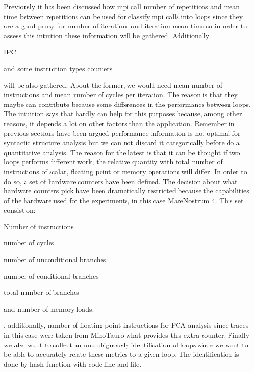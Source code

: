 Previously it has been discussed how mpi call number of repetitions and mean time
between repetitions can be used for classify mpi calls into loops since they are 
a good proxy for number of iterations and iteration mean time so in order to
assess this intuition these information will be gathered. 
Additionally
\begin{enumerate*}[label=\roman*)]
    \item IPC 
    \item and some instruction types counters 
\end{enumerate*}
will be also gathered.
About the former, we would need mean number of instructions and mean number of 
cycles per iteration. The reason is that they maybe can contribute because some 
differences in the performance between loops. The intuition says that
hardly can help for this purposes because, among other reasons, it depends a lot
on other factors than the application. Remember in previous sections have been argued
performance information is not optimal for syntactic structure analysis but we can not
discard it categorically before do a quantitative analysis. The reason for the
latest is that it can be thought if two loops performs different work, the
relative quantity with total number of instructions of scalar, floating point 
or memory operations will differ. In order to do so, a set of hardware
counters have been defined. The decision about what hardware counters
pick have been dramatically restricted because the capabilities of the
hardware used for the experiments, in this case MareNostrum 4. 
This set consist on:
\begin{enumerate*}[label=\roman*)]
  \item Number of instructions
  \item number of cycles 
  \item number of unconditional branches
  \item number of conditional branches 
  \item total number of branches
  \item and number of memory loads.
\end{enumerate*},
additionally, number of floating point instructions for PCA analysis since
traces in this case were taken from MinoTauro what provides this extra counter. 
Finally we also want to collect an unambiguously identification of loops
since we want to be able to accurately relate these metrics to a given loop.
The identification is done by hash function with code line and file.

